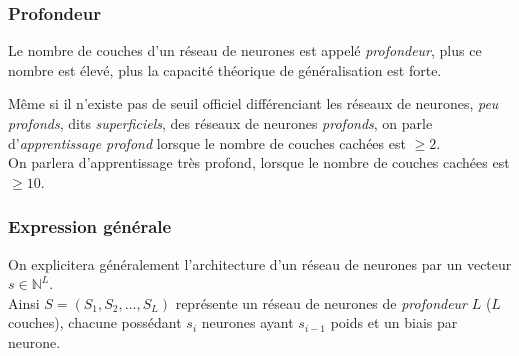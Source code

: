 \documentclass[10pt,a4paper]{report}
\begin{document}
		\subsubsection{Profondeur}
		\begin{center}
			Le nombre de couches d'un réseau de neurones est appelé \emph{profondeur}, plus ce nombre est élevé, plus la capacité théorique de généralisation est forte.
		\end{center}
		Même si il n'existe pas de seuil officiel différenciant les réseaux de neurones, \emph{peu profonds}, dits \emph{superficiels}, des réseaux de neurones \emph{profonds}, on parle d'\emph{apprentissage profond} lorsque le nombre de couches cachées est $\geq 2$.\\
		On parlera d'apprentissage très profond, lorsque le nombre de couches cachées est $\geq 10$.\\
		\subsubsection{Expression générale}
		On explicitera généralement l'architecture d'un réseau de neurones par un vecteur $s \in \mathbb{N}^L$.\\
		Ainsi $S = (S_1, S_2, ..., S_L)$ représente un réseau de neurones de \emph{profondeur} $L$ ($L$ couches), chacune possédant $s_i$ neurones ayant $s_{i-1}$ poids et un biais par neurone.
\end{document}
